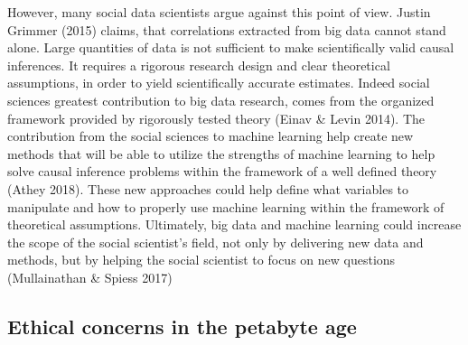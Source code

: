 \documentclass[10pt,a4paper]{report}
\begin{document}
However, many social data scientists argue against this point of view. Justin Grimmer (2015) claims, that correlations extracted from big data cannot stand alone. Large quantities of data is not sufficient to make scientifically valid causal inferences. It requires a rigorous research design and clear theoretical assumptions, in order to yield scientifically accurate estimates. Indeed social sciences greatest contribution to big data research, comes from the organized framework provided by rigorously tested theory (Einav \& Levin 2014).\newline
The contribution from the social sciences to machine learning help create new methods that will be able to utilize the strengths of machine learning to help solve causal inference problems within the framework of a well defined theory (Athey 2018). These new approaches could help define what variables to manipulate and how to properly use machine learning within the framework of theoretical assumptions. Ultimately, big data and machine learning could increase the scope of the social scientist's field, not only by delivering new data and methods, but by helping the social scientist to focus on new questions (Mullainathan \& Spiess 2017)

\subsection{Ethical concerns in the petabyte age}
\end{document}
